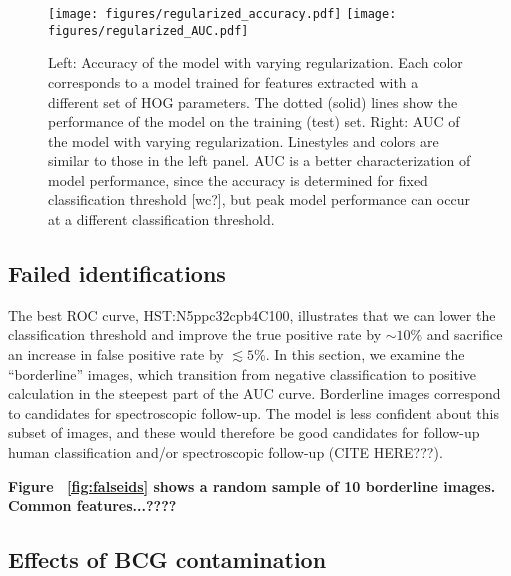 \documentclass{emulateapj}
\newcommand{\todo}[1]{{\bf\color{blue} #1}}
\def\lsim{\lesssim}
\begin{document}
\begin{figure*}[t]\label{fig:regularization}
\begin{center}
\texttt{[image: figures/regularized\_accuracy.pdf]}\hspace{-20pt}
\texttt{[image: figures/regularized\_AUC.pdf]}
\caption{Left: Accuracy of the model with varying regularization.
  Each color corresponds to a model trained for features extracted
  with a different set of HOG parameters.  The dotted (solid) lines
  show the performance of the model on the training (test) set.
  Right: AUC of the model with varying regularization.  Linestyles and
  colors are similar to those in the left panel.  AUC is a better
  characterization of model performance, since the accuracy is
  determined for fixed classification threshold [wc?], but peak model
  performance can occur at a different classification threshold.}
\end{center}
\end{figure*}


\subsection{Failed identifications}\label{sec:failedids}

The best ROC curve, HST:N5ppc32cpb4C100, illustrates that we can lower
the classification threshold and improve the true positive rate by
$\sim10\%$ and sacrifice an increase in false positive rate by
$\lsim5\%$.  In this section, we examine the ``borderline'' images,
which transition from negative classification to positive calculation
in the steepest part of the AUC curve.  Borderline images correspond
to candidates for spectroscopic follow-up.  The model is less
confident about this subset of images, and these would therefore be
good candidates for follow-up human classification and/or
spectroscopic follow-up (CITE HERE???).

\todo{Figure ~\ref{fig:falseids} shows a random sample of 10 borderline
images.  Common features...????}


\subsection{Effects of BCG contamination}
\end{document}
